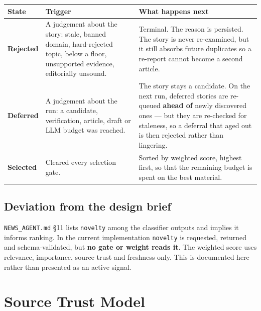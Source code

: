 \documentclass[11pt,a4paper]{article}
\newcommand{\file}[1]{\textcolor{aitkGray}{\texttt{\footnotesize\hyphenpenalty=0\exhyphenpenalty=0\relax #1}}}
\newcommand{\brk}{\hyphenpenalty=0\exhyphenpenalty=0\relax}
\newcommand{\code}[1]{\texttt{\small\brk #1}}
\begin{document}
\begin{center}
\small
\begin{tabularx}{\textwidth}{@{}p{2.2cm} >{\RaggedRight}X >{\RaggedRight}p{4.2cm}@{}}
\toprule
\textbf{State} & \textbf{Trigger} & \textbf{What happens next} \\
\midrule
\textcolor{aitkStop}{\textbf{Rejected}} &
A judgement about the story: stale, banned domain, hard-rejected topic, below a
floor, unsupported evidence, editorially unsound. &
Terminal. The reason is persisted. The story is never re-examined, but it still
absorbs future duplicates so a re-report cannot become a second article. \\
\textcolor{aitkHold}{\textbf{Deferred}} &
A judgement about the run: a candidate, verification, article, draft or LLM
budget was reached. &
The story stays a candidate. On the next run, deferred stories are re-queued
\textbf{ahead of} newly discovered ones --- but they are re-checked for
staleness, so a deferral that aged out is then rejected rather than lingering. \\
\textcolor{aitkGo}{\textbf{Selected}} &
Cleared every selection gate. &
Sorted by weighted score, highest first, so that the remaining budget is spent on
the best material. \\
\bottomrule
\end{tabularx}
\end{center}

\subsection{Deviation from the design brief}

\begin{holdbox}
\file{NEWS\_AGENT.md} §11 lists \code{novelty} among the classifier outputs and
implies it informs ranking. In the current implementation \code{novelty} is
requested, returned and schema-validated, but \textbf{no gate or weight reads
it}. The weighted score uses relevance, importance, source trust and freshness
only. This is documented here rather than presented as an active signal.
\end{holdbox}

\section{Source Trust Model}
\end{document}
